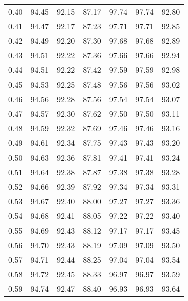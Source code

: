 \begin{tabular}{|c|c|c|c|c|c|c|}
      0.40 &     94.45 &     92.15 &      87.17 &   97.74 &      97.74 &         92.80 \\
      0.41 &     94.47 &     92.17 &      87.23 &   97.71 &      97.71 &         92.85 \\
      0.42 &     94.49 &     92.20 &      87.30 &   97.68 &      97.68 &         92.89 \\
      0.43 &     94.51 &     92.22 &      87.36 &   97.66 &      97.66 &         92.94 \\
      0.44 &     94.51 &     92.22 &      87.42 &   97.59 &      97.59 &         92.98 \\
      0.45 &     94.53 &     92.25 &      87.48 &   97.56 &      97.56 &         93.02 \\
      0.46 &     94.56 &     92.28 &      87.56 &   97.54 &      97.54 &         93.07 \\
      0.47 &     94.57 &     92.30 &      87.62 &   97.50 &      97.50 &         93.11 \\
      0.48 &     94.59 &     92.32 &      87.69 &   97.46 &      97.46 &         93.16 \\
      0.49 &     94.61 &     92.34 &      87.75 &   97.43 &      97.43 &         93.20 \\
      0.50 &     94.63 &     92.36 &      87.81 &   97.41 &      97.41 &         93.24 \\
      0.51 &     94.64 &     92.38 &      87.87 &   97.38 &      97.38 &         93.28 \\
      0.52 &     94.66 &     92.39 &      87.92 &   97.34 &      97.34 &         93.31 \\
      0.53 &     94.67 &     92.40 &      88.00 &   97.27 &      97.27 &         93.36 \\
      0.54 &     94.68 &     92.41 &      88.05 &   97.22 &      97.22 &         93.40 \\
      0.55 &     94.69 &     92.43 &      88.12 &   97.17 &      97.17 &         93.45 \\
      0.56 &     94.70 &     92.43 &      88.19 &   97.09 &      97.09 &         93.50 \\
      0.57 &     94.71 &     92.44 &      88.25 &   97.04 &      97.04 &         93.54 \\
      0.58 &     94.72 &     92.45 &      88.33 &   96.97 &      96.97 &         93.59 \\
      0.59 &     94.74 &     92.47 &      88.40 &   96.93 &      96.93 &         93.64 \\

\end{tabular}

